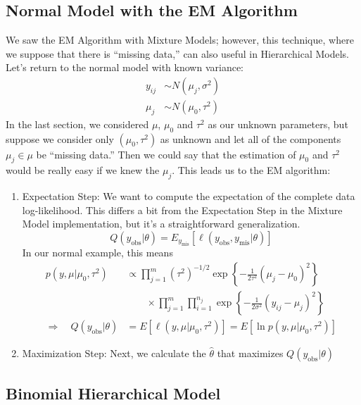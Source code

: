 \documentclass[12pt]{article}
\begin{document}
\newpage
\subsection{Normal Model with the EM Algorithm}

We saw the EM Algorithm with Mixture Models; however, this technique, 
where we suppose that there is ``missing data,''
can also useful in Hierarchical Models.  Let's return to the normal
model with known variance:
\begin{align*}
   y_{ij} &\sim N(\mu_j, \sigma^2) \\
   \mu_j &\sim N(\mu_0, \tau^2) 
\end{align*}
In the last section, we considered $\mu$, $\mu_0$ and $\tau^2$ as our
unknown parameters, but suppose we consider only $(\mu_0, \tau^2)$ as
unknown and let all of the components $\mu_j \in \mu$ be ``missing
data.'' Then we could say that the estimation of $\mu_0$ and $\tau^2$
would be really easy if we knew the $\mu_j$. This leads us to the
EM algorithm:
\begin{enumerate}
   \item Expectation Step: We want to compute the expectation of the
      complete data log-likelihood. This differs a bit from the 
      Expectation Step in the Mixture Model implementation, but
      it's a straightforward generalization.
      \[ Q(y_{\text{obs}} | \theta) = E_{y_\text{mis}}\left[ 
	 \ell(y_{\text{obs}}, y_{\text{mis}} | \theta) \right]\]
      In our normal example, this means
      \begin{align*}
	 p(y, \mu | \mu_0, \tau^2) &\propto \prod^m_{j=1} 
	    (\tau^2)^{-1/2} \exp\left\{-\frac{1}{2\tau^2} 
	    (\mu_j - \mu_0)^2\right\} \\
	    &\qquad \times \prod^m_{j=1} \prod^{n_j}_{i=1}
	    \exp\left\{ -\frac{1}{2\sigma^2}(y_{ij}-\mu_j)^2\right\} \\
	 \Rightarrow \quad Q(y_{\text{obs}}|\theta)
	    &= E[\ell(y,\mu|\mu_0, \tau^2)] = E[\ln 
	    p(y, \mu | \mu_0, \tau^2)]
      \end{align*}
   \item Maximization Step: Next, we calculate the $\hat{\theta}$ 
      that maximizes $Q(y_{\text{obs}}|\theta)$
\end{enumerate}

\newpage
\subsection{Binomial Hierarchical Model}
\end{document}
